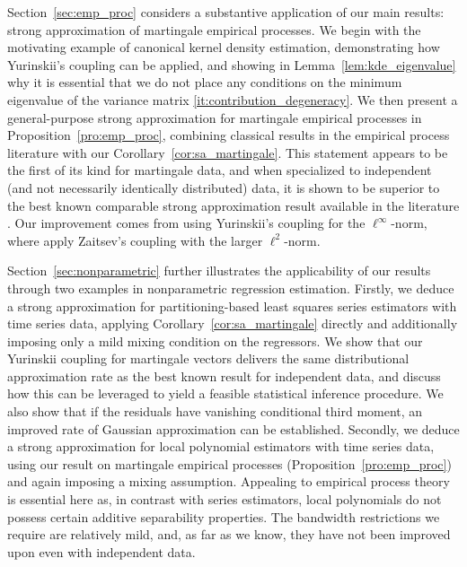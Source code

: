 Section~\ref{sec:emp_proc} considers a substantive application of our main
results: strong approximation of martingale empirical processes. We begin with
the motivating example of canonical kernel density estimation, demonstrating
how Yurinskii's coupling can be applied, and showing in
Lemma~\ref{lem:kde_eigenvalue} why it is essential that we do not place any
conditions on the minimum eigenvalue of the variance matrix
\ref{it:contribution_degeneracy}.
We then present a general-purpose strong
approximation for martingale empirical processes in
Proposition~\ref{pro:emp_proc}, combining classical results in the empirical
process literature \citep{van1996weak} with our
Corollary~\ref{cor:sa_martingale}. This statement appears to be the first of
its kind for martingale data, and when specialized to independent
(and not necessarily identically distributed) data, it is
shown to be superior to the best known %
comparable strong approximation result
available in the literature \citep{berthet2006revisiting}. Our improvement
comes from using Yurinskii's coupling for the $\ell^\infty$-norm, where
\citet{berthet2006revisiting} apply Zaitsev's coupling
\citep{zaitsev1987estimates, zaitsev1987gaussian} with the larger
$\ell^2$-norm.

Section~\ref{sec:nonparametric} further illustrates the applicability of our
results through two examples in nonparametric regression estimation. Firstly,
we deduce a strong approximation for partitioning-based least squares series
estimators with time series data, applying Corollary~\ref{cor:sa_martingale}
directly and additionally imposing only a mild mixing condition on the
regressors. We show that our Yurinskii coupling for martingale vectors delivers
the same distributional approximation rate as the best %
known result for
independent data, and discuss how this can be leveraged to yield a feasible
statistical inference procedure. We also show that if the residuals have
vanishing conditional third moment, an improved rate of Gaussian approximation
can be established. Secondly, we deduce a strong approximation for local
polynomial estimators with time series data,
using our result on martingale empirical processes
(Proposition~\ref{pro:emp_proc}) and again imposing a mixing assumption.
Appealing to empirical process theory is essential here as, in contrast with
series estimators, local polynomials do not possess certain additive
separability properties. The bandwidth restrictions we require are relatively
mild, and, as far as we know, they have not been improved upon even with
independent data.

